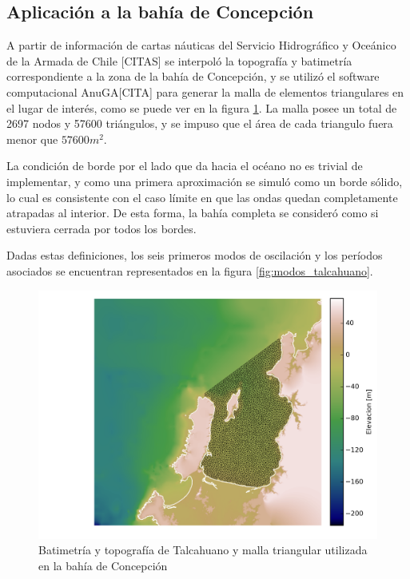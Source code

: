 \subsection{Aplicaci\'on a la bah\'ia de Concepci\'on}

A partir de informaci\'on  de cartas n\'auticas del Servicio Hidrogr\'afico y Oce\'anico de la Armada de Chile [CITAS] se interpol\'o la topograf\'ia y batimetr\'ia correspondiente a la zona de la bah\'ia de Concepci\'on, y se utiliz\'o el software computacional AnuGA[CITA] para generar la malla de elementos triangulares en el lugar de inter\'es, como se puede ver en la figura \ref{fig:bati-talcahuano}. La malla posee un total de 2697 nodos y 57600 tri\'angulos, y se impuso que el \'area de cada triangulo fuera menor que $57600m^2$. 

La condici\'on de borde por el lado que da hacia el oc\'eano no es trivial de implementar, y como una primera aproximaci\'on se simul\'o como un borde s\'olido, lo cual es consistente con el caso l\'imite en que las ondas quedan completamente atrapadas al interior. De esta forma, la bah\'ia completa se consider\'o como si estuviera cerrada por todos los bordes. 

Dadas estas definiciones, los seis primeros modos de oscilaci\'on y los per\'iodos asociados se encuentran representados en la figura \ref{fig:modos_talcahuano}.



\begin{figure}
  \centering
  \includegraphics[width=15cm]{figuras/04bati+malla.png}
  \caption{ Batimetr\'ia y topograf\'ia de Talcahuano y malla triangular utilizada en la bah\'ia de Concepci\'on}  
  \label{fig:bati-talcahuano}
\end{figure}


